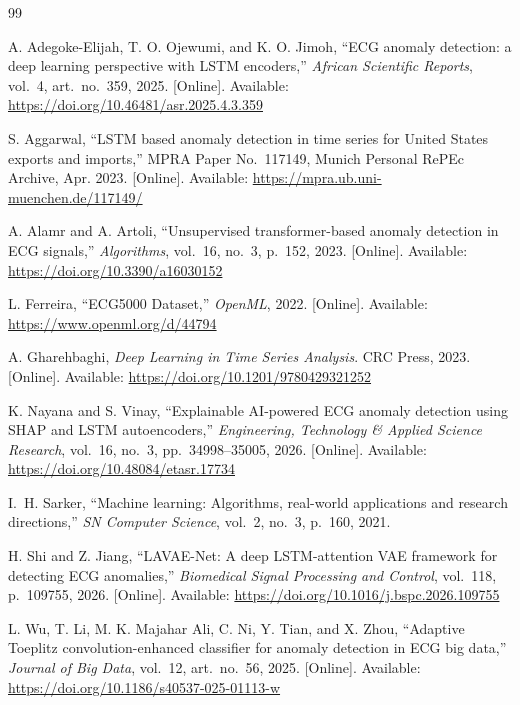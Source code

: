 \documentclass[conference]{IEEEtran}
\begin{document}
\begin{thebibliography}{99}

A. Adegoke-Elijah, T. O. Ojewumi, and K. O. Jimoh, ``ECG anomaly detection: a deep learning perspective with LSTM encoders,'' \textit{African Scientific Reports}, vol.~4, art.~no.~359, 2025. [Online]. Available: \url{https://doi.org/10.46481/asr.2025.4.3.359}

S. Aggarwal, ``LSTM based anomaly detection in time series for United States exports and imports,'' MPRA Paper No.~117149, Munich Personal RePEc Archive, Apr. 2023. [Online]. Available: \url{https://mpra.ub.uni-muenchen.de/117149/}

A. Alamr and A. Artoli, ``Unsupervised transformer-based anomaly detection in ECG signals,'' \textit{Algorithms}, vol.~16, no.~3, p.~152, 2023. [Online]. Available: \url{https://doi.org/10.3390/a16030152}

L. Ferreira, ``ECG5000 Dataset,'' \textit{OpenML}, 2022. [Online]. Available: \url{https://www.openml.org/d/44794}

A. Gharehbaghi, \textit{Deep Learning in Time Series Analysis}. CRC Press, 2023. [Online]. Available: \url{https://doi.org/10.1201/9780429321252}

K. Nayana and S. Vinay, ``Explainable AI-powered ECG anomaly detection using SHAP and LSTM autoencoders,'' \textit{Engineering, Technology \& Applied Science Research}, vol.~16, no.~3, pp.~34998--35005, 2026. [Online]. Available: \url{https://doi.org/10.48084/etasr.17734}

I.~H. Sarker, ``Machine learning: Algorithms, real-world applications and research directions,'' \textit{SN Computer Science}, vol.~2, no.~3, p.~160, 2021.

H. Shi and Z. Jiang, ``LAVAE-Net: A deep LSTM-attention VAE framework for detecting ECG anomalies,'' \textit{Biomedical Signal Processing and Control}, vol.~118, p.~109755, 2026. [Online]. Available: \url{https://doi.org/10.1016/j.bspc.2026.109755}

L. Wu, T. Li, M. K. Majahar Ali, C. Ni, Y. Tian, and X. Zhou, ``Adaptive Toeplitz convolution-enhanced classifier for anomaly detection in ECG big data,'' \textit{Journal of Big Data}, vol.~12, art.~no.~56, 2025. [Online]. Available: \url{https://doi.org/10.1186/s40537-025-01113-w}

\end{thebibliography}
\end{document}
